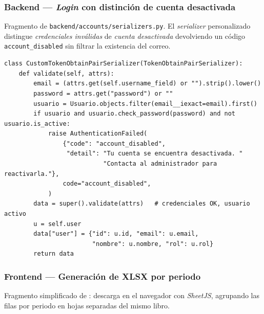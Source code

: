 \subsubsection{Backend --- \emph{Login} con distinción de cuenta desactivada}\label{lst:login_diff}

Fragmento de \texttt{backend/accounts/serializers.py}. El \emph{serializer} personalizado distingue \emph{credenciales inválidas} de \emph{cuenta desactivada} devolviendo un código \texttt{account\_disabled} sin filtrar la existencia del correo.

\begin{lstlisting}[language={[3]Python}]
class CustomTokenObtainPairSerializer(TokenObtainPairSerializer):
    def validate(self, attrs):
        email = (attrs.get(self.username_field) or "").strip().lower()
        password = attrs.get("password") or ""
        usuario = Usuario.objects.filter(email__iexact=email).first()
        if usuario and usuario.check_password(password) and not usuario.is_active:
            raise AuthenticationFailed(
                {"code": "account_disabled",
                 "detail": "Tu cuenta se encuentra desactivada. "
                           "Contacta al administrador para reactivarla."},
                code="account_disabled",
            )
        data = super().validate(attrs)   # credenciales OK, usuario activo
        u = self.user
        data["user"] = {"id": u.id, "email": u.email,
                        "nombre": u.nombre, "rol": u.rol}
        return data
\end{lstlisting}

\subsubsection{Frontend --- Generación de XLSX por periodo}\label{lst:xlsx_por_periodo}

Fragmento simplificado de : descarga en el navegador con \emph{SheetJS}, agrupando las filas por periodo en hojas separadas del mismo libro.

